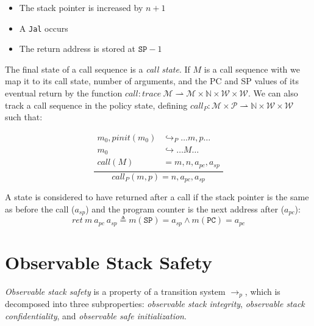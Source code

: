 \documentclass[conference]{IEEEtran}
\begin{document}
      \begin{itemize}
        \item The stack pointer is increased by \(n+1\)
        \item A {\tt Jal} occurs
        \item The return address is stored at \(\mathtt{SP} - 1\)
      \end{itemize}

      The final state of a call sequence is a {\it call state}. If \(M\) is a call sequence with
      we map it to its call state, number of arguments, and the PC and SP values of its eventual
      return by the function \(\mathit{call} : \mathit{trace}\ \mathcal{M} \rightharpoonup \mathcal{M}
      \times \mathbb{N} \times \mathcal{W} \times \mathcal{W}\). We can also track a call sequence in the
      policy state, defining \(\mathit{call}_P : \mathcal{M} \times \mathcal{P} \rightharpoonup \mathbb{N}
      \times \mathcal{W} \times \mathcal{W}\) such that:

      \[\frac{\begin{split}
        m_0,\mathit{pinit}(m_0) & \hookrightarrow_P \dots m,p \dots \\ %
        m_0 & \hookrightarrow \dots M \dots \\
        \mathit{call}(M) & = m, n, a_{pc}, a_{sp}\end{split}}
             {\mathit{call}_P(m,p) = n, a_{pc}, a_{sp}}\]

      A state is considered to have returned after a call if the stack pointer is the same as before the call
      (\(a_{sp}\)) and the program counter is the next address after (\(a_{pc}\)):
      \[\mathit{ret}\ m\ a_{pc}\ a_{sp} \triangleq m(\mathtt{SP}) = a_{sp} \land m(\mathtt{PC}) = a_{pc}\]

  \section{Observable Stack Safety}

    {\it Observable stack safety} is a property of a transition system \(\longrightarrow_p\),
    which is decomposed into three subproperties: {\it observable stack integrity},
    {\it observable stack confidentiality}, and {\it observable safe initialization}. 

\end{document}
